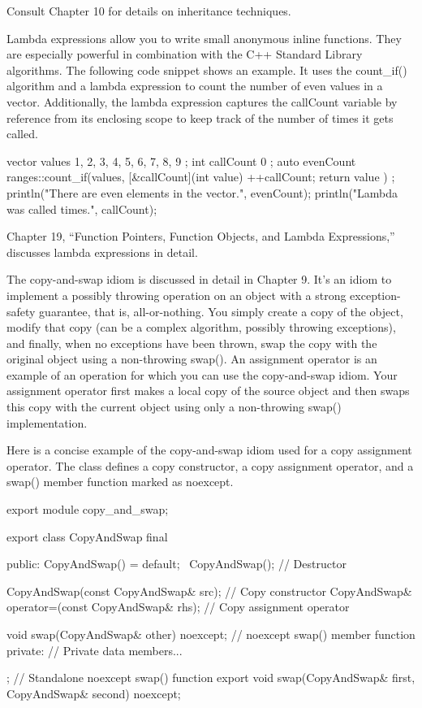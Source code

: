 Consult Chapter 10 for details on inheritance techniques.


Lambda expressions allow you to write small anonymous inline functions. They are especially powerful in combination with the C++ Standard Library algorithms. The following code snippet shows an example. It uses the count\_if() algorithm and a lambda expression to count the number of even values in a vector. Additionally, the lambda expression captures the callCount variable by reference from its enclosing scope to keep track of the number of times it gets called.

\begin{cpp}
vector values { 1, 2, 3, 4, 5, 6, 7, 8, 9 };
int callCount { 0 };
auto evenCount { ranges::count_if(values,
    [&callCount](int value) {
        ++callCount;
        return value %
    })
};
println("There are {} even elements in the vector.", evenCount);
println("Lambda was called {} times.", callCount);
\end{cpp}

Chapter 19, “Function Pointers, Function Objects, and Lambda Expressions,” discusses lambda expressions in detail.


The copy-and-swap idiom is discussed in detail in Chapter 9. It’s an idiom to implement a possibly throwing operation on an object with a strong exception-safety guarantee, that is, all-or-nothing. You simply create a copy of the object, modify that copy (can be a complex algorithm, possibly throwing exceptions), and finally, when no exceptions have been thrown, swap the copy with the original object using a non-throwing swap(). An assignment operator is an example of an operation for which you can use the copy-and-swap idiom. Your assignment operator first makes a local copy of the source object and then swaps this copy with the current object using only a non-throwing swap() implementation.

Here is a concise example of the copy-and-swap idiom used for a copy assignment operator. The class defines a copy constructor, a copy assignment operator, and a swap() member function marked as noexcept.

\begin{cpp}
export module copy_and_swap;

export class CopyAndSwap final
{
    public:
        CopyAndSwap() = default;
        ~CopyAndSwap(); // Destructor

        CopyAndSwap(const CopyAndSwap& src); // Copy constructor
        CopyAndSwap& operator=(const CopyAndSwap& rhs); // Copy assignment operator

        void swap(CopyAndSwap& other) noexcept; // noexcept swap() member function
    private:
        // Private data members...
};
// Standalone noexcept swap() function
export void swap(CopyAndSwap& first, CopyAndSwap& second) noexcept;
\end{cpp}

